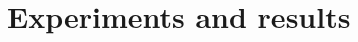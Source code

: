 \documentclass{article}
\theoremstyle{plain}
\theoremstyle{definition}
\theoremstyle{remark}
\newcommand{\Fermi} {\emph{Fermi}\xspace}
\begin{document}

    

\section{Experiments and results} \label{sec:expr}
\end{document}

